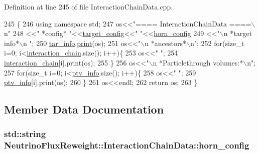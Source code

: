 Definition at line 245 of file Interaction\-Chain\-Data.\-cpp.


\begin{DoxyCode}
245                                                              \{
246     \textcolor{keyword}{using namespace }std;
247     os<<\textcolor{stringliteral}{"==== InteractionChainData ====\(\backslash\)n"}
248       <<\textcolor{stringliteral}{" *config* "}<<\hyperlink{class_neutrino_flux_reweight_1_1_interaction_chain_data_a8362a0f94df2bd321e0b60a38c41fb7a}{target\_config}<<\textcolor{stringliteral}{" "}<<\hyperlink{class_neutrino_flux_reweight_1_1_interaction_chain_data_a343d6a28ec2d41252a6067833b75f831}{horn\_config}
249       <<\textcolor{stringliteral}{"\(\backslash\)n *target info*\(\backslash\)n  "};
250     \hyperlink{class_neutrino_flux_reweight_1_1_interaction_chain_data_a6df89bff97001a4988487fcfb9f4acea}{tar\_info}.\hyperlink{class_neutrino_flux_reweight_1_1_target_data_a3bd231576e6a92d78a95bef604878e5b}{print}(os);
251     os<<\textcolor{stringliteral}{"\(\backslash\)n *ancestors*\(\backslash\)n"};
252     \textcolor{keywordflow}{for}(\textcolor{keywordtype}{size\_t} i=0; i<\hyperlink{class_neutrino_flux_reweight_1_1_interaction_chain_data_a5864063b9c20b4f70e4f1e355df21963}{interaction\_chain}.size(); i++)\{
253       os<<\textcolor{stringliteral}{"   "};
254       \hyperlink{class_neutrino_flux_reweight_1_1_interaction_chain_data_a5864063b9c20b4f70e4f1e355df21963}{interaction\_chain}[i].print(os);
255     \}
256     os<<\textcolor{stringliteral}{"\(\backslash\)n *Particlethrough volumes:*\(\backslash\)n"};
257     \textcolor{keywordflow}{for}(\textcolor{keywordtype}{size\_t} i=0; i<\hyperlink{class_neutrino_flux_reweight_1_1_interaction_chain_data_adda6bc8863579964b62e3d4f51e14926}{ptv\_info}.size(); i++)\{
258       os<<\textcolor{stringliteral}{"   "};
259       \hyperlink{class_neutrino_flux_reweight_1_1_interaction_chain_data_adda6bc8863579964b62e3d4f51e14926}{ptv\_info}[i].print(os);
260     \}
261     os<<endl;
262     \textcolor{keywordflow}{return} os;
263   \}
\end{DoxyCode}


\subsection{Member Data Documentation}
\hypertarget{class_neutrino_flux_reweight_1_1_interaction_chain_data_a343d6a28ec2d41252a6067833b75f831}{
\subsubsection[{horn\-\_\-config}]{\setlength{\rightskip}{0pt plus 5cm}std\-::string Neutrino\-Flux\-Reweight\-::\-Interaction\-Chain\-Data\-::horn\-\_\-config}}\label{class_neutrino_flux_reweight_1_1_interaction_chain_data_a343d6a28ec2d41252a6067833b75f831}


